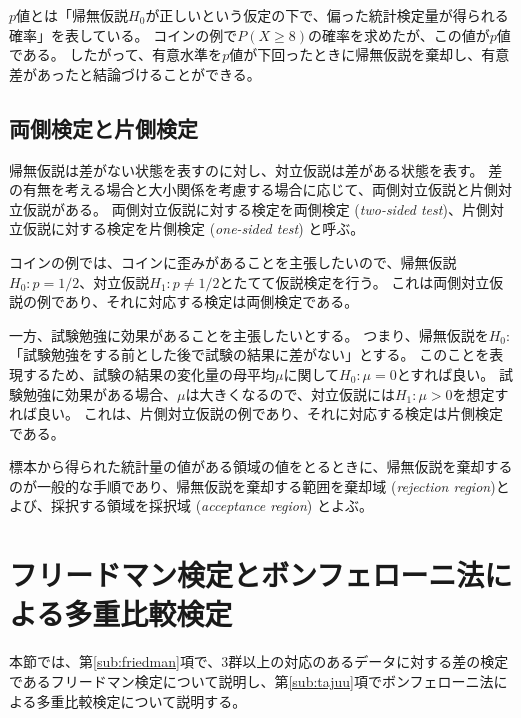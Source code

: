 \documentclass[titlepage,12pt]{jreport}
\begin{document}

$p$値とは「帰無仮説$H_0$が正しいという仮定の下で、偏った統計検定量が得られる確率」を表している。 コインの例で$P(X \geq 8)$の確率を求めたが、この値が$p$値である。 したがって、有意水準を$p$値が下回ったときに帰無仮説を棄却し、有意差があったと結論づけることができる。


\subsection{両側検定と片側検定\label{rejection-region}}
帰無仮説は差がない状態を表すのに対し、対立仮説は差がある状態を表す。 差の有無を考える場合と大小関係を考慮する場合に応じて、両側対立仮説と片側対立仮説がある。 両側対立仮説に対する検定を両側検定 ({\it two-sided test})、片側対立仮説に対する検定を片側検定 ({\it one-sided test}) と呼ぶ。

コインの例では、コインに歪みがあることを主張したいので、帰無仮説$H_{0}: p = 1 / 2$、対立仮説$H_{1} : p \neq 1 / 2$とたてて仮説検定を行う。 これは両側対立仮説の例であり、それに対応する検定は両側検定である。

一方、試験勉強に効果があることを主張したいとする。 つまり、帰無仮説を$H_{0} : $ 「試験勉強をする前とした後で試験の結果に差がない」とする。 このことを表現するため、試験の結果の変化量の母平均$\mu$に関して$H_{0} : \mu = 0$とすれば良い。 試験勉強に効果がある場合、$\mu$は大きくなるので、対立仮説には$H_{1} : \mu > 0$を想定すれば良い。 これは、片側対立仮説の例であり、それに対応する検定は片側検定である。

標本から得られた統計量の値がある領域の値をとるときに、帰無仮説を棄却するのが一般的な手順であり、帰無仮説を棄却する範囲を棄却域 ({\it rejection region})とよび、採択する領域を採択域 ({\it acceptance region}) とよぶ。


\section{フリードマン検定とボンフェローニ法による多重比較検定\label{freedman_testing}}
本節では、第\ref{sub:friedman}項で、3群以上の対応のあるデータに対する差の検定であるフリードマン検定について説明し、第\ref{sub:tajuu}項でボンフェローニ法による多重比較検定について説明する。
\end{document}
